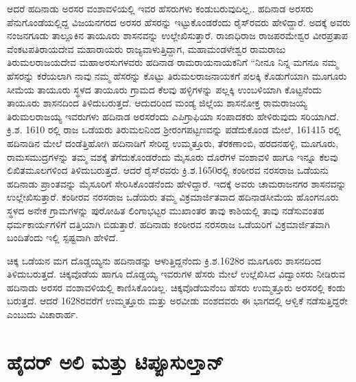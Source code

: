 ಆದರೆ ಹದಿನಾಡು ಅರಸರ ವಂಶಾವಳಿಯಲ್ಲಿ ಇವರ ಹೆಸರುಗಳು ಕಂಡುಬರುವುದಿಲ್ಲ.. ಹದಿನಾಡ ಅರಸರು ಪೆನುಗೊಂಡೆಯಲ್ಲಿದ್ದ ವಿಜಯನಗರದ ಅರಸರ ಹೆಸರನ್ನು ಇಟ್ಟುಕೊಂಡರೆಂದು ರೈಸ್​ರವರು ಹೇಳಿದ್ದಾರೆ. ಅದಕ್ಕೆ ಅವರು ನಂಜನಗೂಡು ತಾಲ್ಲೂಕಿನ ತಾಯೂರು ಶಾಸನವನ್ನು ಉಲ್ಲೇಖಿಸುತ್ತಾರೆ. ರಾಜಾಧಿರಾಜ ರಾಜಪರಮೇಶ್ವರ ವೀರಪ್ರತಾಪ ವೆಂಕಟಪತಿರಾಯದೇವ ಮಹಾರಾಯರು ರಾಜ್ಯವಾಳುತ್ತಿದ್ದಾಗ, ಮಹಾಮಂಡಳೇಶ್ವರ ರಾಮರಾಜು ತಿರುಮಲರಾಜಯದೇವ ಮಹಾಅರಸುಗಳವರು ಹದಿನಾಡ ರಾಮರಾಯನಾಯಕನಿಗೆ “ನೀನೂ ನಿನ್ನ ಮಗನೂ ನಮ್ಮ ಹೆಸರನ್ನು ಕರೆಯಲಾಗಿ ನಾವು ನಮ್ಮ ಹೆಸರನ್ನು ಕೊಟ್ಟು ತಿರುಮಲರಾಜನಾಯಕಗೆ ಪಲಕ್ಕಿ ಕೊಡುಗೆಯಾಗಿ ಮೂಗೂರು ಸೀಮೆಯ ತಾಯೂರು ಸ್ಥಳದ ತಾಯೂರು ಗ್ರಾಮದ ಕೆಲವು ಹಳ್ಳಿಗಳನ್ನು ಪಲ್ಲಕ್ಕಿ ಉಂಬಳಿಯಾಗಿ ಕೊಟ್ಟನೆಂದು ತಾಯೂರು ಶಾಸನದಿಂದ ತಿಳಿದುಬರುತ್ತದೆ. ಆದುದರಿಂದ ಮಂಡ್ಯ ಜಿಲ್ಲೆಯ ಶಾಸನೋಕ್ತ ರಾಮರಾಜಯ್ಯ ತಿರುಮಲರಾಜಯ್ಯ ಇವರುಗಳು ಹದಿನಾಡ ಅರಸರೆಂದು ಎಪಿಗ್ರಾಫಿಯಾ ಸಂಪಾದಕರು ಹೇಳಿರುವುದು ಸರಿಯಾಗಿದೆ. ಕ್ರಿ.ಶ. 1610 ರಲ್ಲಿ ರಾಜ ಒಡೆಯರು ತಿರುಮಲನಿಂದ ಶ‍್ರೀರಂಗಪಟ್ಟಣವನ್ನು ಪಡೆದುಕೊಂಡ ಮೇಲೆ, 161415 ರಲ್ಲಿ ಹದಿನಾಡಿನ ಮೇಲೆ ದಂಡೆತ್ತಿಹೋಗಿ ಹದಿನಾಡಿಗೆ ಸೇರಿದ್ದ ಉಮ್ಮತ್ತೂರು, ತೆರಕಣಾಂಬಿ, ಹರದನಹಳ್ಳಿ, ಮೂಗೂರು, ರಾಮಸಮುದ್ರಗಳನ್ನು ತಮ್ಮ ವಶಕ್ಕೆ ತೆಗೆದುಕೊಂಡರೆಂದು ಮೈಸೂರು ದೊರೆಗಳ ವಂಶಾವಳಿ ಹಾಗೂ ಇನ್ನೂ ಕೆಲವು ಲಿಖಿತಮೂಲಗಳಿಂದ ತಿಳಿದುಬರುತ್ತದೆ. ಆದರೆ ರೈಸ್​ರವರು ಕ್ರಿ.ಶ.1650ರಲ್ಲಿ ಕಂಠೀರವ ನರಸರಾಜ ಒಡೆಯನು ಹದಿನಾಡು ಪ್ರಾಂತವನ್ನು ಮೈಸೂರಿಗೆ ಸೇರಿಸಿಕೊಂಡನೆಂದು ಹೇಳಿದ್ದಾರೆ. ಇದಕ್ಕೆ ಅವರು ಚಾಮರಾಜನಗರ ಶಾಸನವನ್ನು ಉಲ್ಲೇಖಿಸುತ್ತಾರೆ. ಕಂಠೀರವ ನರಸರಾಜ ಒಡೆಯರು ತಮ್ಮ ವಿಕ್ರಮಾರ್ಜಿತವಾದ ಹದಿನಾಡಸೀಮೆಯ ಹೊಂಗನೂರು ಸ್ಥಳದ ಅನೇಕ ಗ್ರಾಮಗಳನ್ನು ಪುರೋಹಿತ ಲಿಂಗಾಭಟ್ಟರ ಮುಖಾಂತರ ತಾವು ಕಾಶಿಯಲ್ಲಿ ತಾವು ನಡೆಸುವಂತಹ ಧರ್ಮಕಾರ್ಯಗಳಿಗೆ ದತ್ತಿಯಾಗಿ ಬಿಡುತ್ತಾರೆ. ಹದಿನಾಡು ಕಂಠೀರವ ನರಸರಾಜ ಒಡೆಯರಿಗೆ ವಿಕ್ರಮಾರ್ಜಿತವಾಗಿ ಬಂದಿತೆಂದು ಇಲ್ಲಿ ಸ್ಪಷ್ಟವಾಗಿ ಹೇಳಿದೆ.

ಚಿಕ್ಕ ಒಡೆಯನ ಮಗ ದೊಡ್ಡಯ್ಯನು ಹದಿನಾಡನ್ನು ಆಳುತ್ತಿದ್ದನೆಂದು ಕ್ರಿ.ಶ.1628ರ ಮೂಗೂರು ಶಾಸನದಿಂದ ತಿಳಿದುಬರುತ್ತದೆ. ಚಿಕ್ಕವೊಡೆಯ ಹಾಗೂ ದೊಡ್ಡಯ್ಯ ಇವರುಗಳ ಹೆಸರು ಮೇಲೆ ಉಲ್ಲೆಖಿಸಿದ ವಿದ್ವಾಂಸರು ನೀಡಿರುವ ಹದಿನಾಡು ಅರಸರ ವಂಶಾವಳಿಯಲ್ಲಿ ಕಾಣಿಸಿಕೊಂಡಿಲ್ಲ. ಚಿಕ್ಕವೊಡೆಯನೆಂಬ ಹೆಸರು ಉಮ್ಮತ್ತೂರು ಅರಸರಲ್ಲಿ ಕಂಡು ಬರುತ್ತದೆ. ಆದರೆ 1628ರವರೆಗೆ ಉಮ್ಮತ್ತೂರು ಮತ್ತು ಅರವೀಡು ವಂಶದವರು ಈ ಭಾಗದಲ್ಲಿ ಆಳ್ವಿಕೆ ನಡೆಸುತ್ತಿದ್ದರೇ ಎಂಬುದು ವಿಚಾರಾರ್ಹ.


\section{ಹೈದರ್​ ಅಲಿ ಮತ್ತು ಟಿಪ್ಪೂಸುಲ್ತಾನ್​}

